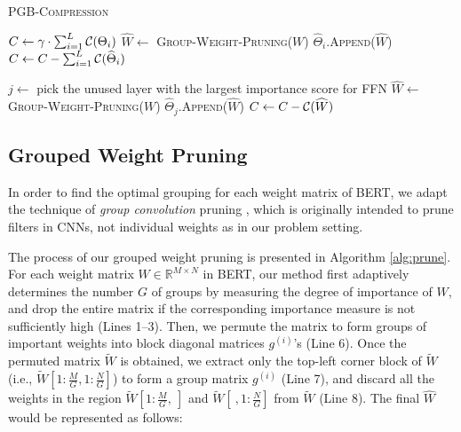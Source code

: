 \begin{algorithm}[t!]
\SetNoFillComment
\DontPrintSemicolon
	{
        \small
		\caption{\small \textsc{PGB-Compression}}\label{alg:pgb}


         
            $C \leftarrow \gamma \cdot \sum_{i=1}^{L}\mathcal{C}({\Theta_i})$ \;
    		{
                {
                    $\widehat{W} \leftarrow$ \textsc{Group-Weight-Pruning}($W$) \;
                    $\widehat{\Theta}_{i}$.\textsc{Append}($\widehat{W}$) \;
                }
    		}
            $C \leftarrow C - \sum_{i=1}^{L}\mathcal{C}({\widehat{\Theta}_{i}})$ \;
            {
                $j \leftarrow$ pick the unused layer with the largest importance score for FFN \;
                {
                    $\widehat{W} \leftarrow$ \textsc{Group-Weight-Pruning}($W$) \;
                    $\widehat{\Theta}_{j}$.\textsc{Append}($\widehat{W}$) \;
                    $C \leftarrow C - \mathcal{C}({\widehat{W}})$\;
                }
    
        }

 }
\end{algorithm} 


\subsection{Grouped Weight Pruning} 


In order to find the optimal grouping for each weight matrix of BERT, we adapt the technique of \textit{group convolution} pruning \cite{DGC,Zhao}, which is originally intended to prune filters in CNNs, not individual weights as in our problem setting.

The process of our grouped weight pruning is presented in Algorithm \ref{alg:prune}. For each weight matrix $W\in \mathbb{R}^{M\times N}$ in BERT, our method first adaptively determines the number $G$ of groups by measuring the degree of importance of $W$, and drop the entire matrix if the corresponding importance measure is not sufficiently high (Lines 1--3). Then, we permute the matrix to form groups of important weights into block diagonal matrices $g^{(i)}$'s (Line 6). Once the permuted matrix $\widetilde{W}$ is obtained, we extract only the top-left corner block of $\widetilde{W}$ (i.e., $\widetilde{W}[1:\frac{M}{G}, 1:\frac{N}{G}]$) to form a group matrix $g^{(i)}$ (Line 7), and discard all the weights in the region $\widetilde{W}[1:\frac{M}{G},~]$ and $\widetilde{W}[~, 1:\frac{N}{G}]$ from $\widetilde{W}$ (Line 8). The final $\widehat{W}$ would be represented as follows:


